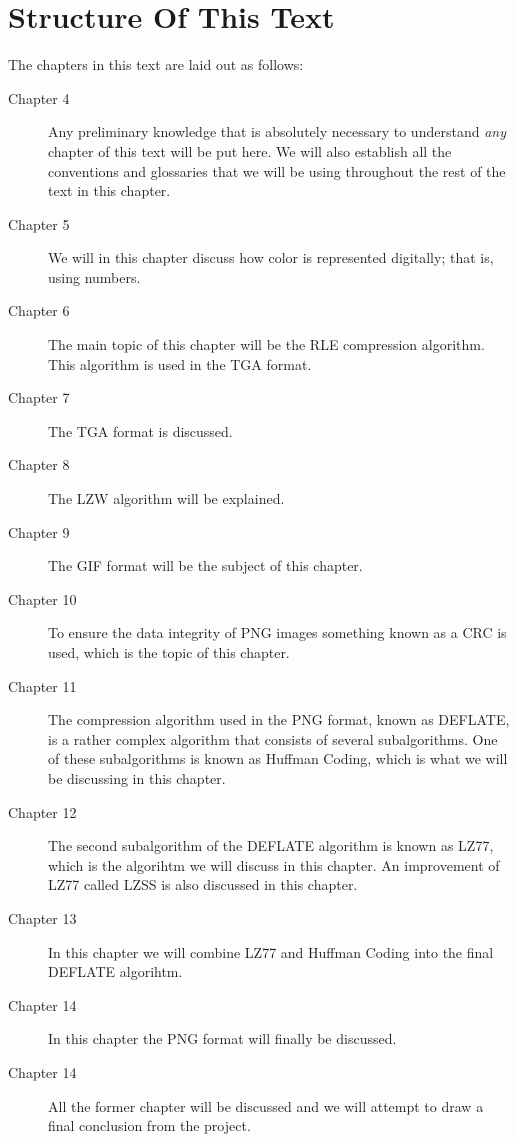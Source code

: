 \section{Structure Of This Text}

The chapters in this text are laid out as follows:

\begin{description}
\item[Chapter 4] Any preliminary knowledge that is absolutely
  necessary to understand \textit{any} chapter of this text will be
  put here. We will also establish all the conventions and glossaries
  that we will be using throughout the rest of the text in this
  chapter.

\item[Chapter 5] We will in this chapter discuss how color is
  represented digitally; that is, using numbers.

\item[Chapter 6] The main topic of this chapter will be the RLE
  compression algorithm. This algorithm is used in the TGA format.

\item[Chapter 7] The TGA format is discussed.

\item[Chapter 8] The LZW algorithm will be explained.

\item[Chapter 9] The GIF format will be the subject of this chapter.

\item[Chapter 10] To ensure the data integrity of PNG images something
  known as a CRC is used, which is the topic of this chapter.

\item[Chapter 11] The compression algorithm used in the PNG format,
  known as DEFLATE, is a rather complex algorithm that consists of
  several subalgorithms. One of these subalgorithms is known as
  Huffman Coding, which is what we will be discussing in this chapter.

\item[Chapter 12] The second subalgorithm of the DEFLATE algorithm is
  known as LZ77, which is the algorihtm we will discuss in this
  chapter. An improvement of LZ77 called LZSS is also discussed in
  this chapter.

\item[Chapter 13] In this chapter we will combine LZ77 and Huffman
  Coding into the final DEFLATE algorihtm.

\item[Chapter 14] In this chapter the PNG format will finally be
  discussed.

\item[Chapter 14] All the former chapter will be discussed and we will
  attempt to draw a final conclusion from the project.


\end{description}

